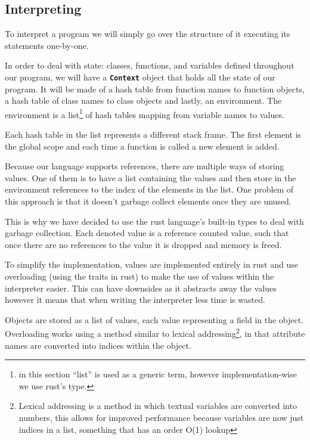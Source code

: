 \documentclass{article}
\begin{document}
\subsection{Interpreting}

To interpret a program we will simply go over the structure of it executing its
statements one-by-one.

In order to deal with state: classes, functions, and variables defined
throughout our program, we will have a \textbf{\texttt{Context}} object that
holds all the state of our program. It will be made of a hash table from
function names to function objects, a hash table of class names to class
objects and lastly, an environment. The environment is a list\footnote{in this
section ``list'' is used as a generic term, however implementation-wise we use
rust's  type.} of hash tables mapping from variable names to
values.

Each hash table in the list represents a different stack frame. The first
element is the global scope and each time a function is called a new element is
added.

Because our language supports references, there are multiple ways of storing
values. One of them is to have a list containing the values and then store in
the environment references to the index of the elements in the list. One
problem of this approach is that it doesn't garbage collect elements once they
are unused.

This is why we have decided to use the rust language's built-in types to deal
with garbage collection. Each denoted value is a reference counted value, such
that once there are no references to the value it is dropped and memory is
freed.

To simplify the implementation, values are implemented entirely in rust and use
overloading (using the traits in rust) to make the use of values within the
interpreter easier. This can have downsides as it abstracts away the values
however it means that when writing the interpreter less time is wasted.

Objects are stored as a list of values, each value representing a field in the
object. Overloading works using a method similar to lexical
addressing\footnote{Lexical addressing is a method in which textual variables
are converted into numbers, this allows for improved performance because
variables are now just indices in a list, something that has an order O(1)
lookup}, in that attribute names are converted into indices within the object.
\end{document}
